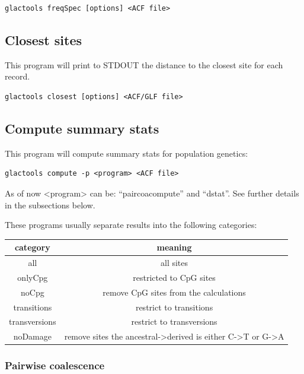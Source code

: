\documentclass[a4paper]{article}
\begin{document}
\begin{lstlisting}
glactools freqSpec [options] <ACF file>
\end{lstlisting}

\subsection{Closest sites}

\noindent This program will print to STDOUT the distance to the closest site for each record.

\begin{lstlisting}
glactools closest [options] <ACF/GLF file>
\end{lstlisting}






\subsection{Compute summary stats}

\noindent This program will compute summary stats for population genetics:

\begin{lstlisting}
glactools compute -p <program> <ACF file>
\end{lstlisting}

As of now <program> can be: ``paircoacompute'' and ``dstat''. See further details in the subsections below.

These programs usually separate results into the following categories:

\begin{tabular}{c|c}
{\bf category}  & {\bf meaning} \\
\hline
all            &  all sites \\
onlyCpg        & restricted to CpG sites \\
noCpg          & remove CpG sites from the calculations \\
transitions    & restrict to transitions \\
transversions  & restrict to transversions \\
noDamage       & remove sites the ancestral->derived is either C->T or G->A \\
\hline
\end{tabular}



\subsubsection{Pairwise coalescence}
\end{document}
